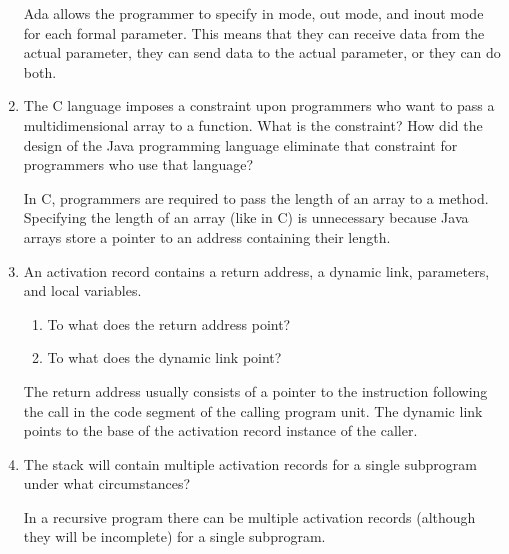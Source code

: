 \begin{enumerate}
  \begin{answer}

Ada allows the programmer to specify in mode, out mode, and inout mode for each formal parameter.  This means that they can receive data from the actual parameter, they can send data to the actual parameter, or they can do both.

    \end{answer}


  \item The C language imposes a constraint upon programmers
    who want to pass a multidimensional array to a function.
    What is the constraint? How did the design of the Java
    programming language eliminate that constraint for 
    programmers who use that language?

  \begin{answer}

In C, programmers are required to pass the length of an array to a method. Specifying the length of an array (like in C) is unnecessary because Java arrays store a pointer to an address containing their length. 

    \end{answer}


  \item An activation record contains a return
    address, a dynamic link, parameters, and
    local variables.
  \begin{enumerate}
    \item To what does the return address point?
    \item To what does the dynamic link point?
    \end{enumerate}

  \begin{answer}

The return address usually consists of a pointer to the instruction following the call in the code segment of the calling program unit.  The dynamic link points to the base of the activation record instance of the caller.

    \end{answer}


  \item The stack will contain multiple activation
    records for a single subprogram under what
    circumstances?

  \begin{answer}

In a recursive program there can be multiple activation records (although they will be incomplete) for a single subprogram.


\end{answer}
\end{enumerate}
